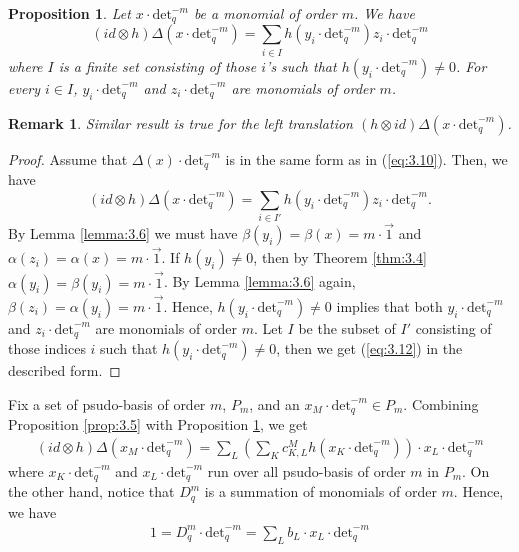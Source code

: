 \documentclass[table,a4paper,reqno]{amsart}
\numberwithin{equation}{section}
\newtheorem*{remark}{Remark}
\newtheorem{proposition}[theorem]{Proposition}
\theoremstyle{definition}
\begin{document}
\begin{proposition}\label{prop:3.7}
    Let $x\cdot\text{det}_q^{-m}$ be a monomial of order $m$. We have
    \begin{equation}\label{eq:3.12}
        (id\otimes h)\Delta(x\cdot\text{det}_q^{-m})=\sum_{i\in I}h(y_i\cdot\text{det}_q^{-m})z_i\cdot\text{det}_q^{-m}
    \end{equation}
    where $I$ is a finite set consisting of those $i$'s such that $h(y_i\cdot\text{det}_q^{-m})\ne 0$. For every $i\in I$, $y_i\cdot\text{det}_q^{-m}$ and $z_i\cdot\text{det}_q^{-m}$ are monomials of order $m$. 
\end{proposition}
\begin{remark}
    Similar result is true for the left translation $(h\otimes id)\Delta(x\cdot\text{det}_q^{-m})$.
\end{remark}
\begin{proof}
    Assume that $\Delta(x)\cdot\text{det}_q^{-m}$ is in the same form as in (\ref{eq:3.10}). Then, we have
    \begin{equation}\label{eq:3.13}
        (id\otimes h)\Delta(x\cdot\text{det}_q^{-m})=\sum_{i\in I'}h(y_i\cdot\text{det}_q^{-m})z_i\cdot\text{det}_q^{-m}.
    \end{equation}
    By Lemma \ref{lemma:3.6} we must have $\beta(y_i)=\beta(x)=m\cdot \Vec{1}$ and $\alpha(z_i)=\alpha(x)=m\cdot \Vec{1}$. If $h(y_i)\ne 0$, then by Theorem \ref{thm:3.4} $\alpha(y_i)=\beta(y_i)=m\cdot \Vec{1}$. By Lemma \ref{lemma:3.6} again, $\beta(z_i)=\alpha(y_i)=m\cdot \Vec{1}$. Hence, $h(y_i\cdot\text{det}_q^{-m})\ne 0$ implies that both $y_i\cdot\text{det}_q^{-m}$ and $z_i\cdot\text{det}_q^{-m}$ are monomials of order $m$. Let $I$ be the subset of $I'$ consisting of those indices $i$ such that $h(y_i\cdot\text{det}_q^{-m})\ne 0$, then we get (\ref{eq:3.12}) in the described form.
\end{proof}
Fix a set of psudo-basis of order $m$, $P_m$, and an $x_M\cdot\text{det}_q^{-m}\in P_m$. Combining Proposition \ref{prop:3.5} with Proposition \ref{prop:3.7}, we get 
\begin{align}\label{eq:3.14}
    (id\otimes h)\Delta(x_M\cdot\text{det}_q^{-m})=\sum_{L}\left(\sum_{K}c^M_{K,L}h(x_K\cdot\text{det}_q^{-m})\right)\cdot x_L\cdot\text{det}_q^{-m}
\end{align}
where $x_K\cdot\text{det}_q^{-m}$ and $x_L\cdot\text{det}_q^{-m}$ run over all psudo-basis of order $m$ in $P_m$. On the other hand, notice that $D_q^m$ is a summation of monomials of order $m$. Hence, we have
\begin{align}\label{eq:3.15}
    1=D_q^m\cdot \text{det}_q^{-m}=\sum_L b_L\cdot x_L\cdot \text{det}_q^{-m}
\end{align}
\end{document}
